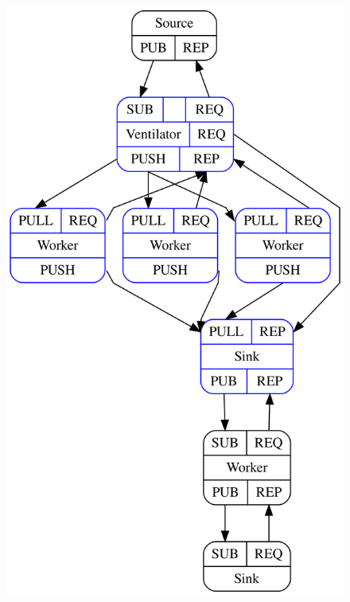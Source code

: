 \documentclass[titlepage,a4paper,oneside]{article}
\begin{document}
\begin{figure}[H]
\centering
\includegraphics[width=\textwidth]{images/structs.png}
\end{figure}


\printbibliography
\end{document}
